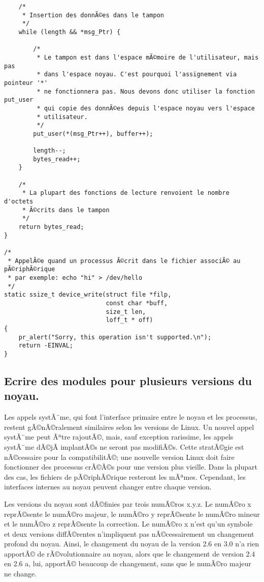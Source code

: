 \documentclass[11pt]{article}
\begin{document}
\begin{verbatim}
    /*
     * Insertion des donnÃ©es dans le tampon
     */
    while (length && *msg_Ptr) {

        /*
         * Le tampon est dans l'espace mÃ©moire de l'utilisateur, mais pas
         * dans l'espace noyau. C'est pourquoi l'assignement via pointeur '*'
         * ne fonctionnera pas. Nous devons donc utiliser la fonction put_user
         * qui copie des donnÃ©es depuis l'espace noyau vers l'espace
         * utilisateur.
         */
        put_user(*(msg_Ptr++), buffer++);

        length--;
        bytes_read++;
    }

    /*
     * La plupart des fonctions de lecture renvoient le nombre d'octets
     * Ã©crits dans le tampon
     */
    return bytes_read;
}

/*
 * AppelÃ©e quand un processus Ã©crit dans le fichier associÃ© au pÃ©riphÃ©rique
 * par exemple: echo "hi" > /dev/hello
 */
static ssize_t device_write(struct file *filp,
                            const char *buff,
                            size_t len,
                            loff_t * off)
{
    pr_alert("Sorry, this operation isn't supported.\n");
    return -EINVAL;
}
\end{verbatim}

\subsection*{Ecrire des modules pour plusieurs versions du noyau.}
\label{sec-6-6}

Les appels systÃ¨me, qui font l'interface primaire entre le noyau et les processus, restent gÃ©nÃ©ralement similaires selon les versions de Linux. Un nouvel appel systÃ¨me peut Ãªtre rajoutÃ©, mais, sauf exception rarissime, les appels systÃ¨me dÃ©jÃ  implantÃ©s ne seront pas modifiÃ©s. Cette stratÃ©gie est nÃ©cessaire pour la compatibilitÃ©; une nouvelle version Linux doit faire fonctionner des processus crÃ©Ã©s pour une version plus vieille. Dans la plupart des cas, les fichiers de pÃ©riphÃ©rique resteront les mÃªmes. Cependant, les interfaces internes au noyau peuvent changer entre chaque version.

Les versions du noyau sont dÃ©finies par trois numÃ©ros x.y.z. Le numÃ©ro x reprÃ©sente le numÃ©ro majeur, le numÃ©ro y reprÃ©sente le numÃ©ro mineur et le numÃ©ro z reprÃ©sente la correction. Le numÃ©ro x n'est qu'un symbole et deux versions diffÃ©rentes n'impliquent pas nÃ©cessairement un changement profond du noyau. Ainsi, le changement du noyau de la version 2.6 en 3.0 n'a rien apportÃ© de rÃ©volutionnaire au noyau, alors que le changement de version 2.4 en 2.6 a, lui, apportÃ© beaucoup de changement, sans que le numÃ©ro majeur ne change.
\end{document}
